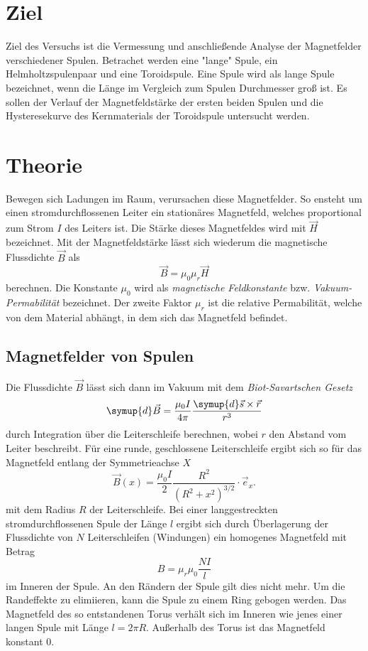 \section{Ziel}
\label{sec:Ziel}
Ziel des Versuchs ist die Vermessung und anschließende Analyse der Magnetfelder verschiedener Spulen. Betrachet werden eine "lange" \: Spule, ein Helmholtzspulenpaar und eine 
Toroidspule. Eine Spule wird als lange Spule bezeichnet, wenn die Länge im Vergleich zum Spulen Durchmesser groß ist.
Es sollen der Verlauf der Magnetfeldstärke der ersten beiden Spulen und die Hysteresekurve des Kernmaterials der Toroidspule untersucht werden.

\section{Theorie}
\label{sec:Theorie}
Bewegen sich Ladungen im Raum, verursachen diese Magnetfelder. So ensteht um einen stromdurchflossenen Leiter ein stationäres Magnetfeld, welches proportional zum Strom 
$I$ des Leiters ist. Die Stärke dieses Magnetfeldes wird mit $\vec{H}$ bezeichnet. Mit der Magnetfeldstärke lässt sich wiederum die magnetische Flussdichte $\vec{B}$ als 
\begin{equation*}
    \vec{B} = \mu_0 \mu_r \vec{H}
\end{equation*} 
berechnen. Die Konstante $\mu_0$ wird als \textit{magnetische Feldkonstante} bzw. \textit{Vakuum-Permabilität} bezeichnet. Der zweite Faktor $\mu_r$ ist die relative Permabilität,
welche von dem Material abhängt, in dem sich das Magnetfeld befindet. 

\subsection{Magnetfelder von Spulen}
\label{subsec:Spulen}
Die Flussdichte $\vec{B}$ lässt sich dann im Vakuum mit dem \textit{Biot-Savartschen Gesetz}
\begin{equation}
    \label{eqn:BiotSavart}
    \symup{d} \vec{B} = \frac{\mu_0 I}{4 \pi}\frac{\symup{d}\vec{s} \times \vec{r}}{r^3}
\end{equation}
durch Integration über die Leiterschleife berechnen, wobei $r$ den Abstand vom Leiter beschreibt. Für eine runde, geschlossene Leiterschleife ergibt sich so für das Magnetfeld
entlang der Symmetrieachse $X$
\begin{equation*}
    \vec{B}(x) = \frac{\mu_0 I}{2} \frac{R^2}{(R^2+x^2)^{3/2}} \cdot {\vec{e}_x}.
\end{equation*}
mit dem Radius $R$ der Leiterschleife.
Bei einer langgestreckten stromdurchflossenen Spule der Länge $l$ ergibt sich durch Überlagerung der Flussdichte von $N$ Leiterschleifen (Windungen) ein homogenes Magnetfeld mit 
Betrag
\begin{equation}
    \label{eqn:LangeSpule}
    B = \mu_r \mu_0 \frac{N I}{l}
\end{equation}
im Inneren der Spule. An den Rändern der Spule gilt dies nicht mehr. 
Um die Randeffekte zu elimiieren, kann die Spule zu einem Ring gebogen werden. Das Magnetfeld des so entstandenen Torus verhält sich im Inneren wie jenes einer langen Spule mit
Länge $l = 2\pi R$. Außerhalb des Torus ist das Magnetfeld konstant 0. 

